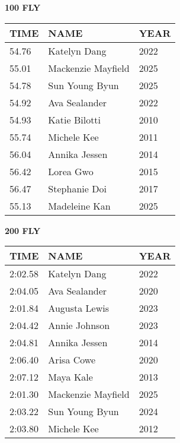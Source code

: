 \begin{minipage}[t]{0.48\textwidth}
\centering
\textbf{100 FLY}\\[0.05cm]
\begin{tabular}{@{}p{1.8cm}p{2.8cm}p{1.2cm}@{}}
\hline
\textbf{TIME} & \textbf{NAME} & \textbf{YEAR} \\
\hline
54.76 & Katelyn Dang & 2022 \\
55.01 & Mackenzie Mayfield & 2025 \\
54.78 & Sun Young Byun & 2025 \\
54.92 & Ava Sealander & 2022 \\
54.93 & Katie Bilotti & 2010 \\
55.74 & Michele Kee & 2011 \\
56.04 & Annika Jessen & 2014 \\
56.42 & Lorea Gwo & 2015 \\
56.47 & Stephanie Doi & 2017 \\
55.13 & Madeleine Kan & 2025 \\
\hline
\end{tabular}
\end{minipage}\hfill
\begin{minipage}[t]{0.48\textwidth}
\centering
\textbf{200 FLY}\\[0.05cm]
\begin{tabular}{@{}p{1.8cm}p{2.8cm}p{1.2cm}@{}}
\hline
\textbf{TIME} & \textbf{NAME} & \textbf{YEAR} \\
\hline
2:02.58 & Katelyn Dang & 2022 \\
2:04.05 & Ava Sealander & 2020 \\
2:01.84 & Augusta Lewis & 2023 \\
2:04.42 & Annie Johnson & 2023 \\
2:04.81 & Annika Jessen & 2014 \\
2:06.40 & Arisa Cowe & 2020 \\
2:07.12 & Maya Kale & 2013 \\
2:01.30 & Mackenzie Mayfield & 2025 \\
2:03.22 & Sun Young Byun & 2024 \\
2:03.80 & Michele Kee & 2012 \\
\hline
\end{tabular}
\end{minipage}

\vspace{0.4cm}

